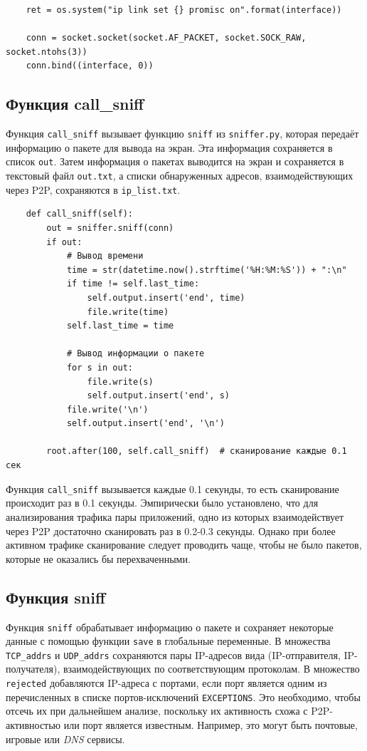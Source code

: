 \documentclass[bachelor, och, coursework]{SCWorks}
\begin{document}
\begin{verbatim}
    ret = os.system("ip link set {} promisc on".format(interface))

    conn = socket.socket(socket.AF_PACKET, socket.SOCK_RAW, socket.ntohs(3))
    conn.bind((interface, 0))
\end{verbatim}

\subsection{Функция call_sniff}
Функция \texttt{call_sniff} вызывает функцию \texttt{sniff} из \texttt{sniffer.py}, которая передаёт информацию о пакете для вывода на экран. Эта информация сохраняется в список \texttt{out}. Затем информация о пакетах выводится на экран и сохраняется в текстовый файл \texttt{out.txt}, а списки обнаруженных адресов, взаимодействующих через P2P, сохраняются в \texttt{ip_list.txt}.

\begin{verbatim}
    def call_sniff(self):
        out = sniffer.sniff(conn)
        if out:
            # Вывод времени
            time = str(datetime.now().strftime('%H:%M:%S')) + ":\n"
            if time != self.last_time:
                self.output.insert('end', time)
                file.write(time)
            self.last_time = time

            # Вывод информации о пакете
            for s in out:
                file.write(s)
                self.output.insert('end', s)
            file.write('\n')
            self.output.insert('end', '\n')

        root.after(100, self.call_sniff)  # сканирование каждые 0.1 сек
\end{verbatim}

Функция \texttt{call_sniff} вызывается каждые 0.1 секунды, то есть сканирование происходит раз в 0.1 секунды.
Эмпирически было установлено, что для анализирования трафика пары приложений, одно из которых взаимодействует через P2P достаточно сканировать раз в 0.2-0.3 секунды. Однако при более активном трафике сканирование следует проводить чаще, чтобы не было пакетов, которые не оказались бы перехваченными.

\subsection{Функция sniff}
Функция \texttt{sniff} обрабатывает информацию о пакете и сохраняет некоторые данные с помощью функции \texttt{save} в глобальные переменные.
В множества \texttt{TCP_addrs} и \texttt{UDP_addrs} сохраняются пары IP-адресов вида (IP-отправителя, IP-получателя), взаимодействующих по соответствующим протоколам.
В множество \texttt{rejected} добавляются IP-адреса с портами, если порт является одним из перечисленных в списке портов-исключений \texttt{EXCEPTIONS}. 
Это необходимо, чтобы отсечь их при дальнейшем анализе, поскольку их активность схожа с P2P-активностью или порт является известным. Например, это могут быть почтовые, игровые или \textit{DNS} сервисы. 
\end{document}
